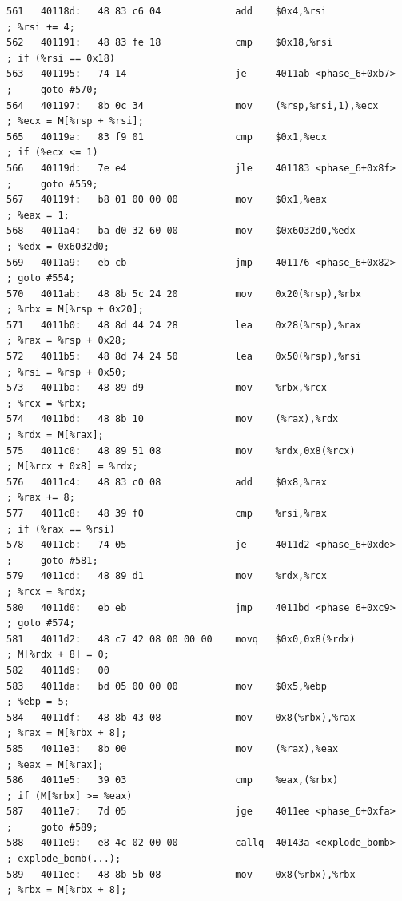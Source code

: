 \documentclass{article}
\begin{document}
\begin{lstlisting}[title = phase\_6对应的反汇编代码及注释, xleftmargin = 2em,xrightmargin = 2em, aboveskip = 1em, numbers = none, basicstyle=\footnotesize\ttfamily]
561   40118d:   48 83 c6 04             add    $0x4,%rsi                    ; %rsi += 4;
562   401191:   48 83 fe 18             cmp    $0x18,%rsi                   ; if (%rsi == 0x18)
563   401195:   74 14                   je     4011ab <phase_6+0xb7>        ;     goto #570;
564   401197:   8b 0c 34                mov    (%rsp,%rsi,1),%ecx           ; %ecx = M[%rsp + %rsi];
565   40119a:   83 f9 01                cmp    $0x1,%ecx                    ; if (%ecx <= 1)
566   40119d:   7e e4                   jle    401183 <phase_6+0x8f>        ;     goto #559;
567   40119f:   b8 01 00 00 00          mov    $0x1,%eax                    ; %eax = 1;
568   4011a4:   ba d0 32 60 00          mov    $0x6032d0,%edx               ; %edx = 0x6032d0;
569   4011a9:   eb cb                   jmp    401176 <phase_6+0x82>        ; goto #554;
570   4011ab:   48 8b 5c 24 20          mov    0x20(%rsp),%rbx              ; %rbx = M[%rsp + 0x20];
571   4011b0:   48 8d 44 24 28          lea    0x28(%rsp),%rax              ; %rax = %rsp + 0x28;
572   4011b5:   48 8d 74 24 50          lea    0x50(%rsp),%rsi              ; %rsi = %rsp + 0x50;
573   4011ba:   48 89 d9                mov    %rbx,%rcx                    ; %rcx = %rbx;
574   4011bd:   48 8b 10                mov    (%rax),%rdx                  ; %rdx = M[%rax];
575   4011c0:   48 89 51 08             mov    %rdx,0x8(%rcx)               ; M[%rcx + 0x8] = %rdx;
576   4011c4:   48 83 c0 08             add    $0x8,%rax                    ; %rax += 8;
577   4011c8:   48 39 f0                cmp    %rsi,%rax                    ; if (%rax == %rsi)
578   4011cb:   74 05                   je     4011d2 <phase_6+0xde>        ;     goto #581;
579   4011cd:   48 89 d1                mov    %rdx,%rcx                    ; %rcx = %rdx;
580   4011d0:   eb eb                   jmp    4011bd <phase_6+0xc9>        ; goto #574;
581   4011d2:   48 c7 42 08 00 00 00    movq   $0x0,0x8(%rdx)               ; M[%rdx + 8] = 0;
582   4011d9:   00
583   4011da:   bd 05 00 00 00          mov    $0x5,%ebp                    ; %ebp = 5;
584   4011df:   48 8b 43 08             mov    0x8(%rbx),%rax               ; %rax = M[%rbx + 8];
585   4011e3:   8b 00                   mov    (%rax),%eax                  ; %eax = M[%rax];
586   4011e5:   39 03                   cmp    %eax,(%rbx)                  ; if (M[%rbx] >= %eax)
587   4011e7:   7d 05                   jge    4011ee <phase_6+0xfa>        ;     goto #589;
588   4011e9:   e8 4c 02 00 00          callq  40143a <explode_bomb>        ; explode_bomb(...);
589   4011ee:   48 8b 5b 08             mov    0x8(%rbx),%rbx               ; %rbx = M[%rbx + 8];

\end{lstlisting}
\end{document}
